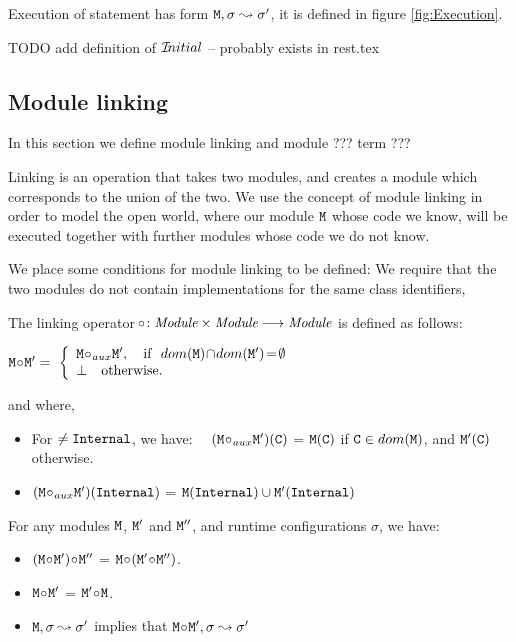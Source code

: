 Execution of statement has   form ${\mbox{\tt{M}}}, \sigma \leadsto \sigma'$, it is defined in figure \ref{fig:Execution}.


TODO add definition of  ${{\mathcal I}\!nitial}$ -- probably exists in rest.tex

\subsection{Module linking}

 In this section we define  module linking and module ??? term ???
 
 Linking is an operation that takes two modules, and creates a module which corresponds  to the union of the two. We use the concept of module linking in order to model the open world, where our module ${\mbox{\tt{M}}}$ whose code we know, will be executed together with further modules whose code we do not know. 

We place some conditions for module linking to be defined: We require that the two modules do not contain implementations for the same class identifiers,  

\begin{definition}

The linking operator $\!\circ\!: {\mbox{\tt{{\it Module}}}} \times  {\mbox{\tt{{\it Module}}}} \longrightarrow {\mbox{\tt{{\it Module}}}}$ is defined as follows:

$
\M \link \M{'}  =\ \left\{
\begin{array}{l}
                        \M \link_{aux} \M{'},\ \ \   \hbox{if}\  \ dom(\M)\!\cap\!dom(\M')\!=\!\emptyset\\
\bot  \ \ \ \mbox{otherwise.}
\end{array}
                    \right.$
                    
and where,                  
\begin{itemize}
     \item 
   For $\neq{\mbox{\tt{Internal}}}$, we have: \ \
   $({\mbox{\tt{M}}} \!\circ\!_{aux} {\mbox{\tt{M}}}')({\mbox{\tt{C}}})$ = ${\mbox{\tt{M}}}({\mbox{\tt{C}}})$  if  ${\mbox{\tt{C}}}\in dom({\mbox{\tt{M}}})$, and  ${\mbox{\tt{M}}}'({\mbox{\tt{C}}})$ otherwise.
    \item  
   $({\mbox{\tt{M}}} \!\circ\!_{aux} {\mbox{\tt{M}}}')({\mbox{\tt{Internal}}})$ = $ {\mbox{\tt{M}}}({\mbox{\tt{Internal}}}) \cup  {\mbox{\tt{M}}}'({\mbox{\tt{Internal}}})$
 \end{itemize}
\end{definition}

 
 \begin{lemma}
 For any modules ${\mbox{\tt{M}}}$,   ${\mbox{\tt{M}}}'$ and ${\mbox{\tt{M}}}''$, and runtime configurations $\sigma$, we have$:$
 \label{lemma:linking:properties}
 
 \begin{itemize}
     \item 
     $({\mbox{\tt{M}}} \!\circ\! {\mbox{\tt{M}}}')\!\circ\! {\mbox{\tt{M}}}''$ = ${\mbox{\tt{M}}} \!\circ\! ({\mbox{\tt{M}}}' \!\circ\! {\mbox{\tt{M}}}'')$.
    \item  
      ${\mbox{\tt{M}}} \!\circ\! {\mbox{\tt{M}}}'$  = ${\mbox{\tt{M}}}' \!\circ\!{\mbox{\tt{M}}}$.
      \item
      ${\mbox{\tt{M}}}, \sigma \leadsto \sigma'$  implies that  ${\mbox{\tt{M}}}\!\circ\! {\mbox{\tt{M}}}', \sigma \leadsto \sigma'$
   \end{itemize}
 
 \end{lemma}
 

